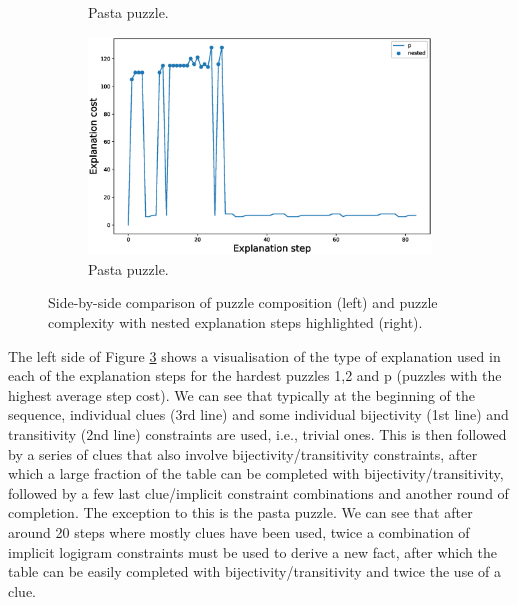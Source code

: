 \begin{figure}[t!]
\begin{subfigure}{.5\textwidth}
				\caption{Pasta puzzle.}
				\label{fig:composition_puzzle:pasta}
		\end{subfigure}%
		\begin{subfigure}{.5\textwidth}
				\centering
				\includegraphics[width=0.84\linewidth]{figures/p.eps}
				\caption{Pasta puzzle.}
				\label{fig:cost_puzzle:pasta}
		\end{subfigure}
		\caption{Side-by-side comparison of puzzle composition (left) and puzzle complexity with nested explanation steps highlighted (right).}
		\label{fig:steps}
\end{figure}


The left side of Figure \ref{fig:steps} shows a visualisation of the type of explanation used in each of the explanation steps for the hardest puzzles 1,2 and p (puzzles with the highest average step cost). 
We can see that typically at the beginning of the sequence, individual clues (3rd line) and some individual bijectivity (1st line) and transitivity (2nd line) constraints are used, i.e., trivial ones.
This is then followed by a series of clues that also involve bijectivity/transitivity constraints, after which a large fraction of the table can be completed with bijectivity/transitivity, followed by a few last clue/implicit constraint combinations and another round of completion.
The exception to this is the pasta puzzle.
We can see that after around 20 steps where mostly clues have been used, twice a combination of implicit logigram constraints must be used to derive a new fact, after which the table can be easily completed with bijectivity/transitivity and twice the use of a clue.

